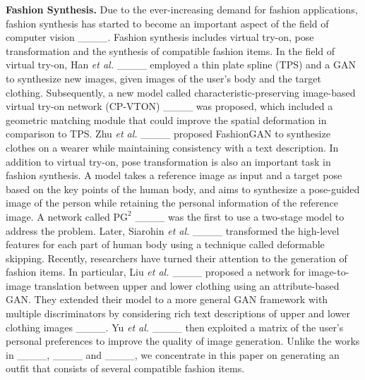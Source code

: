 \textbf{Fashion Synthesis.} Due to the ever-increasing demand for fashion applications, fashion synthesis has started to become an important aspect of the field of computer vision ____. Fashion synthesis includes virtual try-on, pose transformation and the synthesis of compatible fashion items. In the field of virtual try-on, Han \textit{et al.} ____ employed a thin plate spline (TPS) and a GAN to synthesize new images, given images of the user's body and the target clothing. Subsequently, a new model called characteristic-preserving image-based virtual try-on network (CP-VTON) ____ was proposed, which included a geometric matching module that could improve the spatial deformation in comparison to TPS. Zhu \textit{et al.} ____ proposed FashionGAN to synthesize clothes on a wearer while maintaining consistency with a text description. In addition to virtual try-on, pose transformation is also an important task in fashion synthesis. A model takes a reference image as input and a target pose based on the key points of the human body, and aims to synthesize a pose-guided image of the person while retaining the personal information of the reference image. A network called $\mathrm{PG}^2$ ____ was the first to use a two-stage model to address the problem. Later, Siarohin \textit{et al.} ____ transformed the high-level features for each part of human body using a technique called deformable skipping. Recently, researchers have turned their attention to the generation of fashion items. In particular, Liu \textit{et al.} ____ proposed a network for image-to-image translation between upper and lower clothing using an attribute-based GAN. They extended their model to a more general GAN framework with multiple discriminators by considering rich text descriptions of upper and lower clothing images ____. Yu \textit{et al.} ____ then exploited a matrix of the user's personal preferences to improve the quality of image generation. Unlike the works in ____, ____ and ____, we concentrate in this paper on generating an outfit that consists of several compatible fashion items.

